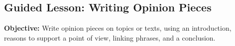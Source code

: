 \documentclass[12pt]{article}
\title{}
\date{}
\begin{document}
\subsection*{Guided Lesson: Writing Opinion Pieces}
\onehalfspacing

\begin{tcolorbox}[colframe=black!40, colback=gray!5, 
coltitle=black, colbacktitle=black!20, fonttitle=\bfseries\Large, 
title=Learning Objective, halign title=center, left=5pt, right=5pt, top=5pt, bottom=15pt]
\textbf{Objective:} Write opinion pieces on topics or texts, using an introduction, reasons to support a point of view, linking phrases, and a conclusion.  
\end{tcolorbox}

\vspace{1em}
\end{document}
